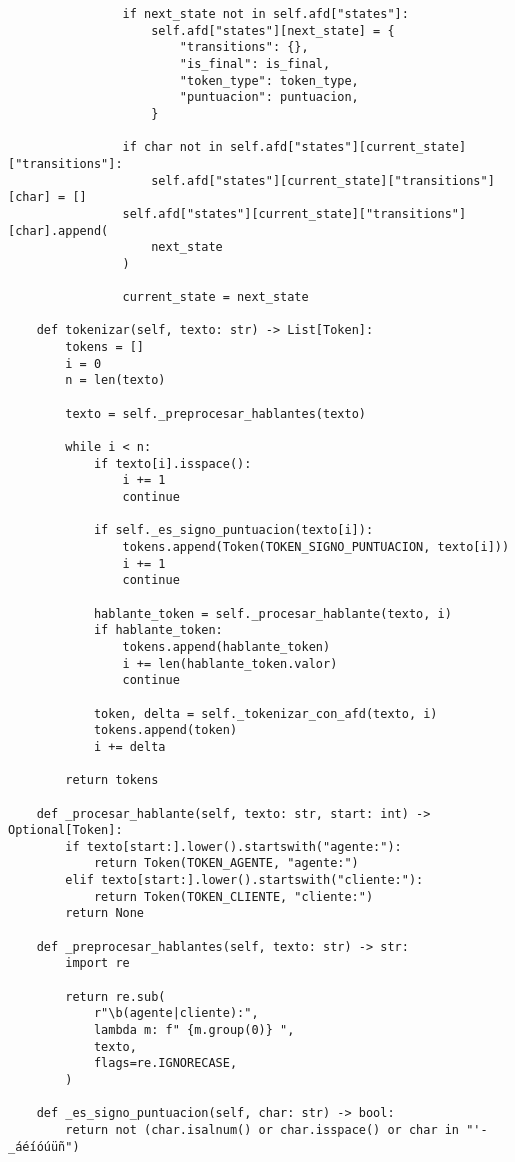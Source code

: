 \begin{lstlisting}
                if next_state not in self.afd["states"]:
                    self.afd["states"][next_state] = {
                        "transitions": {},
                        "is_final": is_final,
                        "token_type": token_type,
                        "puntuacion": puntuacion,
                    }

                if char not in self.afd["states"][current_state]["transitions"]:
                    self.afd["states"][current_state]["transitions"][char] = []
                self.afd["states"][current_state]["transitions"][char].append(
                    next_state
                )

                current_state = next_state

    def tokenizar(self, texto: str) -> List[Token]:
        tokens = []
        i = 0
        n = len(texto)

        texto = self._preprocesar_hablantes(texto)

        while i < n:
            if texto[i].isspace():
                i += 1
                continue

            if self._es_signo_puntuacion(texto[i]):
                tokens.append(Token(TOKEN_SIGNO_PUNTUACION, texto[i]))
                i += 1
                continue

            hablante_token = self._procesar_hablante(texto, i)
            if hablante_token:
                tokens.append(hablante_token)
                i += len(hablante_token.valor)
                continue

            token, delta = self._tokenizar_con_afd(texto, i)
            tokens.append(token)
            i += delta

        return tokens

    def _procesar_hablante(self, texto: str, start: int) -> Optional[Token]:
        if texto[start:].lower().startswith("agente:"):
            return Token(TOKEN_AGENTE, "agente:")
        elif texto[start:].lower().startswith("cliente:"):
            return Token(TOKEN_CLIENTE, "cliente:")
        return None

    def _preprocesar_hablantes(self, texto: str) -> str:
        import re

        return re.sub(
            r"\b(agente|cliente):",
            lambda m: f" {m.group(0)} ",
            texto,
            flags=re.IGNORECASE,
        )

    def _es_signo_puntuacion(self, char: str) -> bool:
        return not (char.isalnum() or char.isspace() or char in "'-_áéíóúüñ")


\end{lstlisting}
